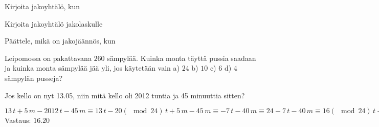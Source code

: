 \begin{tehtavasivu}
\begin{tehtava}
    Kirjoita jakoyhtälö, kun
    
    \begin{vastaus}
    \end{vastaus}
\end{tehtava}

\begin{tehtava}
    Kirjoita jakoyhtälö jakolaskulle
    
    \begin{vastaus}
    \end{vastaus}
\end{tehtava}

\begin{tehtava}
    Päättele, mikä on jakojäännös, kun
    
    \begin{vastaus}
    \end{vastaus}
\end{tehtava}

\begin{tehtava}
    Leipomossa on pakattavana $260$ sämpylää. Kuinka monta täyttä pussia saadaan ja kuinka monta sämpylää jää yli, jos käytetään vain a) $24$ b) $10$ c) $6$ d) $4$ sämpylän pusseja?
    \begin{vastaus}
    \end{vastaus}

\end{tehtava}

\begin{tehtava}
    Jos kello on nyt 13.05, niin mitä kello oli 2012 tuntia ja 45 minuuttia sitten?
    \begin{vastaus}
        $13\, t + 5\, m - 2012\, t - 45\, m \equiv 13\, t - 20(\mod 24)\, t + 5\, m - 45\, m \equiv -7\, t -40\, m \equiv 24 -7\, t -40\, m \equiv 16(\mod 24)\, t + 20\, m $ \\
        Vastaus: $16.20$
    \end{vastaus}
\end{tehtava}


\end{tehtavasivu}
